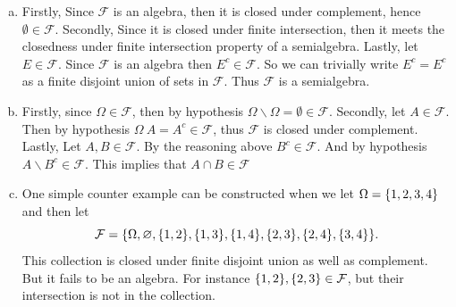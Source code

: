 \begin{solution}
	\begin{enumerate}[(a)]
		\item Firstly, Since $ \mathcal{F} $ is an algebra, then it is closed under complement, hence $ \emptyset \in \mathcal{F} $. Secondly, Since it is closed under finite intersection, then it meets the closedness under finite intersection property of a semialgebra. Lastly, let $ E \in \mathcal{F} $. Since $ \mathcal{F} $ is an algebra then $ E^c \in \mathcal{F} $. So we can trivially write $ E^c = E^c $ as a finite disjoint union of sets in $ \mathcal{F} $. Thus $ \mathcal{F} $ is a semialgebra.
		\item Firstly, since $ \Omega \in \mathcal{F} $, then by hypothesis $ \Omega \backslash \Omega = \emptyset \in \mathcal{F} $. Secondly, let $ A \in \mathcal{F} $. Then by hypothesis $ \Omega \ A = A^c \in \mathcal{F} $, thus $ \mathcal{F} $ is closed under complement. Lastly, Let $ A,B \in \mathcal{F} $. By the reasoning above $ B^c \in \mathcal{F} $. And by hypothesis $ A\backslash B^c \in \mathcal{F} $. This implies that $ A \cap B \in \mathcal{F} $
		\item One simple counter example can be constructed when we let $ \Omega = \{1,2,3,4\} $ and then let 
		\[ \mathcal{F} = \{\Omega,\varnothing, \{1,2\},\{1,3\},\{1,4\},\{2,3\},\{2,4\},\{3,4\}\}. \]
		This collection is closed under finite disjoint union as well as complement. But it fails to be an algebra. For instance $ \{1,2\},\{2,3\} \in \mathcal{F} $, but their intersection is not in the collection.
	\end{enumerate}
\end{solution}

